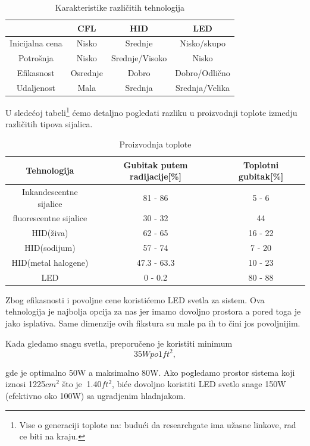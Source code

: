 \documentclass[a4paper,11pt]{book}
\begin{document}
\begin{table}[ht]
  \caption{Karakteristike različitih tehnologija}
  \centering
  \begin{tabular}{|c|c|c|c|}
  \hline
   & CFL & HID & LED \\ \hline
  Inicijalna cena & Nisko & Srednje & Nisko/skupo \\ \hline
  Potrošnja & Nisko & Srednje/Visoko & Nisko \\ \hline
  Efikasnost & Osrednje & Dobro & Dobro/Odlično \\ \hline
  Udaljenost & Mala & Srednja & Srednja/Velika \\ \hline
  \end{tabular}
\end{table}

U sledećoj tabeli\footnote{Vise o generaciji toplote na: budući da researchgate ima užasne linkove, rad ce biti na kraju.} ćemo detaljno pogledati razliku u proizvodnji toplote izmedju različitih tipova sijalica.


\begin{table}[ht]
  \caption{Proizvodnja toplote}
  \centering
  \begin{tabular}{|c|c|c|}
  \hline
    Tehnologija & Gubitak putem radijacije[\%] & Toplotni gubitak[\%] \\ \hline
  Inkandescentne sijalice & 81 - 86 & 5 - 6 \\ \hline
  fluorescentne sijalice & 30 - 32 & 44 \\ \hline
  HID(živa) & 62 - 65 & 16 - 22 \\ \hline
  HID(sodijum) & 57 - 74 & 7 - 20 \\ \hline
  HID(metal halogene) & 47.3 - 63.3 & 10 - 23 \\ \hline
  LED & 0 - 0.2 & 80 - 88 \\ \hline
  \end{tabular}
\end{table}

Zbog efikasnosti i povoljne cene koristićemo LED svetla za sistem. Ova tehnologija je najbolja opcija za nas jer imamo dovoljno prostora a pored toga je jako isplativa. Same dimenzije ovih fikstura su male pa ih to čini jos povoljnijim.


Kada gledamo snagu svetla, preporučeno je koristiti minimum 
\[35W po 1ft^2,\]

gde je optimalno 50W a maksimalno 80W. Ako pogledamo prostor sistema koji iznosi 1225$cm^2$ što je $~$1.40$ft^2$, biće dovoljno koristiti LED svetlo snage 150W (efektivno oko 100W) sa ugradjenim hladnjakom.\\
\end{document}

